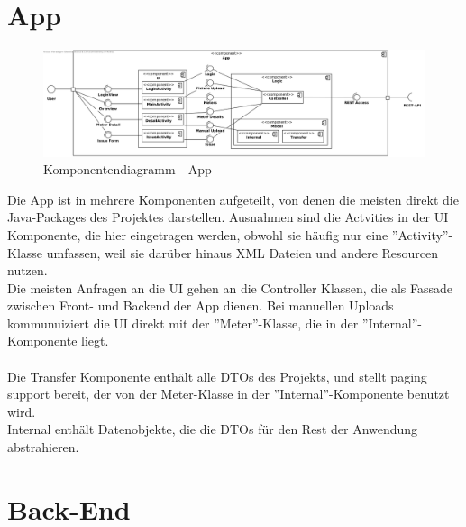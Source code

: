 \section{App}
\begin{figure}[h]
\includegraphics[scale=0.45]{img/diagrams/AppComponentDiagram}\caption{Komponentendiagramm - App}  
\end{figure} \noindent
Die App ist in mehrere Komponenten aufgeteilt, von denen die meisten direkt die Java-Packages des Projektes darstellen. Ausnahmen sind die Actvities in der UI Komponente, die hier eingetragen werden, obwohl sie häufig nur eine ''Activity''-Klasse umfassen, weil sie darüber hinaus XML Dateien und andere Resourcen nutzen.\\
Die meisten Anfragen an die UI gehen an die Controller Klassen, die als Fassade zwischen Front- und Backend der App dienen. Bei manuellen Uploads kommunuiziert die UI direkt mit der ''Meter''-Klasse, die in der ''Internal''-Komponente liegt.\\ \\
Die Transfer Komponente enthält alle DTOs des Projekts, und stellt paging support bereit, der von der Meter-Klasse in der ''Internal''-Komponente benutzt wird.\\
Internal enthält Datenobjekte, die die DTOs für den Rest der Anwendung abstrahieren.
\section{Back-End}

